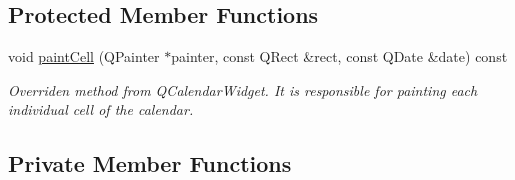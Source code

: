 \subsection*{Protected Member Functions}
\begin{DoxyCompactItemize}
\item 
void \hyperlink{class_actions_calendar_a98854bcac5911622fff6672062bb9b79}{paint\-Cell} (Q\-Painter $\ast$painter, const Q\-Rect \&rect, const Q\-Date \&date) const 
\begin{DoxyCompactList}\small\item\em Overriden method from Q\-Calendar\-Widget. It is responsible for painting each individual cell of the calendar. \end{DoxyCompactList}\end{DoxyCompactItemize}
\subsection*{Private Member Functions}
